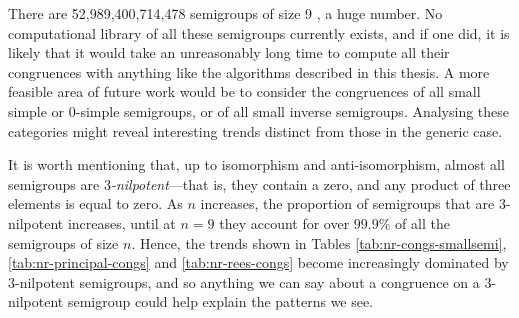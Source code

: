 There are 52,989,400,714,478 semigroups of size 9 \cite{order_nine}, a huge
number.  No computational library of all these semigroups currently exists, and
if one did, it is likely that it would take an unreasonably long time to compute
all their congruences with anything like the algorithms described in this
thesis.  A more feasible area of future work would be to consider the
congruences of all small simple or 0-simple semigroups, or of all small inverse
semigroups.  Analysing these categories might reveal interesting trends distinct
from those in the generic case.

It is worth mentioning that, up to isomorphism and anti-isomorphism, almost all
semigroups are \textit{$3$-nilpotent}---that is, they contain a zero, and any
product of three elements is equal to zero.  As $n$ increases, the proportion of
semigroups that are $3$-nilpotent increases, until at $n=9$ they account for
over $99.9\%$ of all the semigroups of size $n$.  Hence, the trends shown in
Tables \ref{tab:nr-congs-smallsemi}, \ref{tab:nr-principal-congs} and
\ref{tab:nr-rees-congs} become increasingly dominated by $3$-nilpotent
semigroups, and so anything we can say about a congruence on a $3$-nilpotent
semigroup could help explain the patterns we see.
